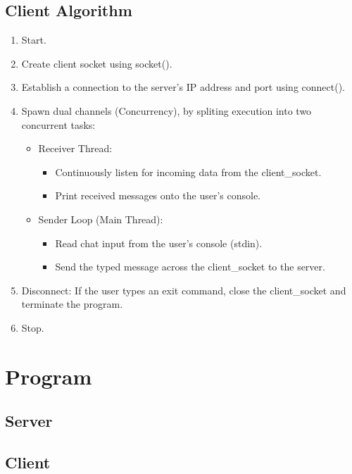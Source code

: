 \documentclass[12pt, a4paper]{report}
\begin{document}
\subsection*{Client Algorithm}
\begin{enumerate}
	\item Start.
	\item Create client socket using socket().
	\item Establish a connection to the server's IP address and port using connect().
	\item Spawn dual channels (Concurrency), by spliting execution into two concurrent tasks:
	\begin{itemize}
		\item Receiver Thread:
		\begin{itemize}
			\item Continuously listen for incoming data from the client\_socket.
			\item Print received messages onto the user's console.
		\end{itemize}
		\item Sender Loop (Main Thread):
		\begin{itemize}
			\item Read chat input from the user's console (stdin).
			\item Send the typed message across the client\_socket to the server.
		\end{itemize}
	\end{itemize}
	\item Disconnect: If the user types an exit command, close the client\_socket and terminate the program.
	\item Stop.
\end{enumerate}

\section*{Program}

\subsection*{Server}


\subsection*{Client}

\end{document}
